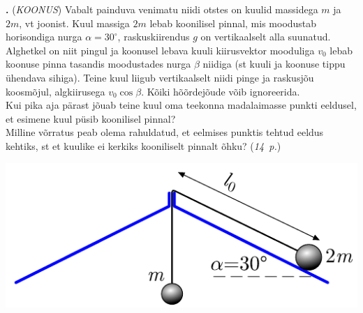 \documentclass[11pt,a5paper]{article}
\newcommand{\numb}[1]{\vspace{5pt}\textbf{\large #1}}
\newcommand{\nimi}[1]{(\textsl{\small #1})}
\newcommand{\punktid}[1]{(\emph{#1~p.})}
\newcommand{\autor}[1]{}
\newcounter{ylesanne}
\newcommand{\yl}[1]{\addtocounter{ylesanne}{1}\numb{\theylesanne.} \nimi{#1} \newblock{}}
\begin{document}
	\vspace{-4pt}
	\yl{KOONUS}
	Vabalt painduva venimatu niidi otstes on kuulid massidega $m$ ja $2m$, vt joonist. Kuul massiga $2m$ lebab koonilisel pinnal, mis moodustab horisondiga nurga $\alpha=30^\circ$, raskuskiirendus $g$ on vertikaalselt alla suunatud. Alghetkel on niit pingul ja koonusel lebava kuuli kiirusvektor mooduliga $v_0$ lebab koonuse pinna tasandis moodustades nurga $\beta$ niidiga (st kuuli ja koonuse tippu ühendava sihiga). Teine kuul liigub vertikaalselt niidi pinge ja raskusjõu koosmõjul, algkiirusega $v_0\cos\beta$. Kõiki hõõrdejõude võib ignoreerida.\\
	\osa Kui pika aja pärast  jõuab teine kuul oma teekonna madalaimasse punkti eeldusel, et esimene kuul püsib koonilisel pinnal?\\
	\osa Milline võrratus peab olema rahuldatud, et eelmises punktis tehtud eeldus kehtiks, st et kuulike ei kerkiks kooniliselt pinnalt õhku?
	\punktid{14} \autor{Jaan Kalda}
	
	\begin{center}
		\vspace{-13pt}
		\includegraphics[width=0.55\linewidth]{koonus.pdf}
	\end{center}
\end{document}
